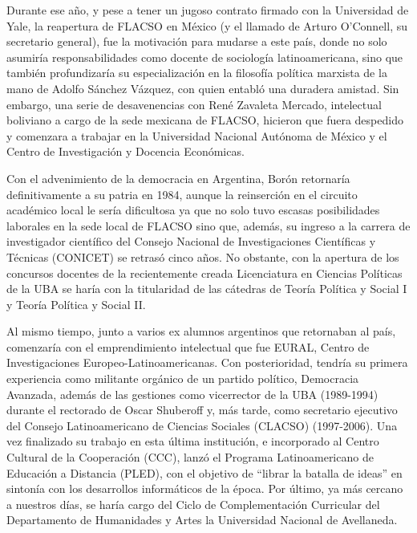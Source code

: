 {Durante ese año, y pese a tener un jugoso contrato firmado con la Universidad de Yale, la reapertura de FLACSO en México (y el llamado de Arturo O'Connell, su secretario general), fue la motivación para mudarse a este país, donde no solo asumiría responsabilidades como docente de sociología latinoamericana, sino que también profundizaría su especialización en la filosofía política marxista de la mano de Adolfo Sánchez Vázquez, con quien entabló una duradera amistad. Sin embargo, una serie de desavenencias con René Zavaleta Mercado, intelectual boliviano a cargo de la sede mexicana de FLACSO, hicieron que fuera despedido y comenzara a trabajar en la Universidad Nacional Autónoma de México y el Centro de Investigación y Docencia Económicas.

Con el advenimiento de la democracia en Argentina, Borón retornaría definitivamente a su patria en 1984, aunque la reinserción en el circuito académico local le sería dificultosa ya que no solo tuvo escasas posibilidades laborales en la sede local de FLACSO sino que, además, su ingreso a la carrera de investigador científico del Consejo Nacional de Investigaciones Científicas y Técnicas (CONICET) se retrasó cinco años. No obstante, con la apertura de los concursos docentes de la recientemente creada Licenciatura en Ciencias Políticas de la UBA se haría con la titularidad de las cátedras de Teoría Política y Social I y Teoría Política y Social II.

Al mismo tiempo, junto a varios ex alumnos argentinos que retornaban al país, comenzaría con el emprendimiento intelectual que fue EURAL, Centro de Investigaciones Europeo-Latinoamericanas. Con posterioridad, tendría su primera experiencia como militante orgánico de un partido político, Democracia Avanzada, además de las gestiones como vicerrector de la UBA (1989-1994) durante el rectorado de Oscar Shuberoff y, más tarde, como secretario ejecutivo del Consejo Latinoamericano de Ciencias Sociales (CLACSO) (1997-2006). Una vez finalizado su trabajo en esta última institución, e incorporado al Centro Cultural de la Cooperación (CCC), lanzó el Programa Latinoamericano de Educación a Distancia (PLED), con el objetivo de \enquote{librar la batalla de ideas} en sintonía con los desarrollos informáticos de la época. Por último, ya más cercano a nuestros días, se haría cargo del Ciclo de Complementación Curricular del Departamento de Humanidades y Artes la Universidad Nacional de Avellaneda.

}
